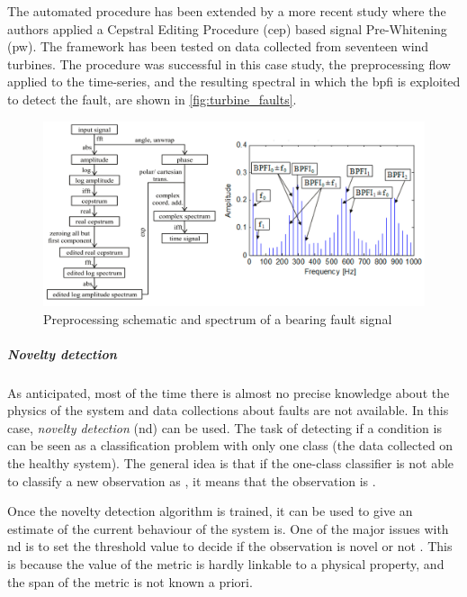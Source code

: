 The automated procedure \cite{sawalhi2008semi} has been extended by a more recent study \cite{schlechtingen2019automated} where the authors applied a Cepstral Editing Procedure (\gls{cep}) based signal Pre-Whitening (\gls{pw}). The framework has been tested on data collected from seventeen wind turbines. The procedure was successful in this case study, the preprocessing flow applied to the time-series, and the resulting spectral in which the \gls{bpfi} is exploited to detect the fault, are shown in \autoref{fig:turbine_faults}.

\begin{figure}
    \centering
    \includegraphics[width=\textwidth]{images/StateArt/spectrum.png}
    \caption{Preprocessing schematic and spectrum of a bearing fault signal \cite{schlechtingen2019automated}}
    \label{fig:turbine_faults}
\end{figure}

\subparagraph*{Novelty detection}
As anticipated, most of the time there is almost no precise knowledge about the physics of the system and data collections about faults are not available. In this case, \emph{novelty detection} (\gls{nd}) can be used. The task of detecting if a condition is  can be seen as a classification problem with only one class (the data collected on the healthy system). The general idea is that if the one-class classifier is not able to classify a new observation as , it means that the observation is .

Once the novelty detection algorithm is trained, it can be used to give an estimate of  the current behaviour of the system is. One of the major issues with \gls{nd} is to set the threshold value to decide if the observation is novel or not \cite{NoveltyReview}. This is because the value of the metric is hardly linkable to a physical property, and the span of the metric is not known a priori.

